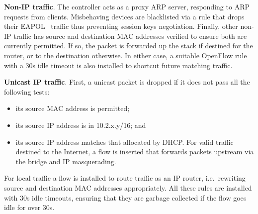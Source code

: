 \textbf{Non-IP traffic}.  The controller acts as a proxy ARP server,
responding to ARP requests from clients.  Misbehaving devices are
blacklisted via a rule that drops their EAPOL~\cite{rfc:3748} traffic
thus preventing session keys negotiation.
Finally, other non-IP traffic has source and destination MAC addresses
verified to ensure both are currently permitted.  If so, the packet is
forwarded up the stack if destined for the router, or to the
destination otherwise.  In either case, a suitable OpenFlow rule with
a 30s idle timeout is also installed to shortcut future matching
traffic.

\textbf{Unicast IP traffic}.  First, a unicast packet is dropped if it
does not pass all the following tests: 
\begin{itemize}
    \item its source MAC address is
permitted; 
    \item its source IP address is in 10.2.x.y/16; and
    \item its source IP address matches that allocated by DHCP.  For
valid traffic destined to the Internet, a flow is inserted that forwards
packets upstream via the bridge and IP masquerading.  
\end{itemize}
For local traffic 
a flow is installed to route traffic as an
IP router, i.e.~rewriting source and destination MAC
addresses appropriately. 
All these rules are installed with 30s idle timeouts,
ensuring that they are garbage collected if the flow goes idle for
over 30s.

